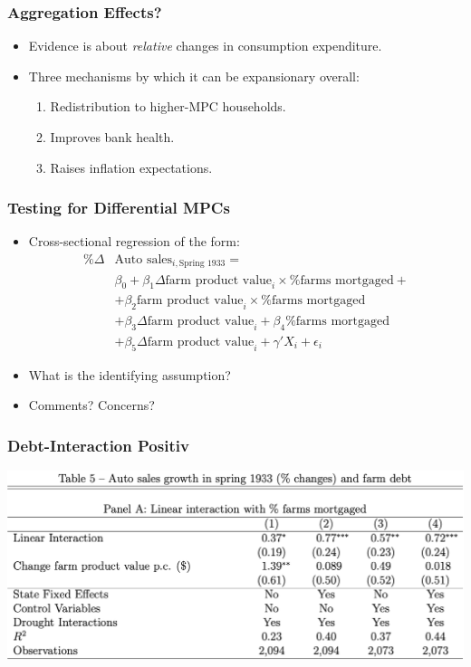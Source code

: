 \documentclass[english,xcolor=svgnames]{beamer}
\begin{document}
\begin{frame}
\frametitle[alignment=center]{Aggregation Effects?}
\begin{itemize}
	\item Evidence is about \emph{relative} changes in consumption expenditure.
	\item Three mechanisms by which it can be expansionary overall:
	\begin{enumerate}
		\item Redistribution to higher-MPC households.
		\item Improves bank health.
		\item Raises inflation expectations.
	\end{enumerate}
\end{itemize}
\end{frame}

\begin{frame}
\frametitle[alignment=center]{Testing for Differential MPCs}
\begin{itemize}
	\item Cross-sectional regression of the form:
	\begin{align*}
		\%\Delta &\text{Auto sales}_{i,\text{Spring 1933}} =\\
		&  \beta_0 + \beta_1 \Delta\text{farm product value}_i \times \% \text{farms mortgaged} + \\ 
		&+ \beta_2 \text{farm product value}_i \times \% \text{farms mortgaged} \\
		&+ \beta_3 \Delta\text{farm product value}_i  +\beta_4 \% \text{farms mortgaged} \\
		& + \beta_5 \Delta\text{farm product value}_i  + \gamma'X_i+\epsilon_i
	\end{align*}
	\item What is the identifying assumption?
	\item Comments? Concerns?
\end{itemize}
\end{frame}

\begin{frame}
\frametitle[alignment=center]{Debt-Interaction Positiv}
\centering
\includegraphics[scale=0.4]{figures/HRWTAB5a.png}
\end{frame}
\end{document}
